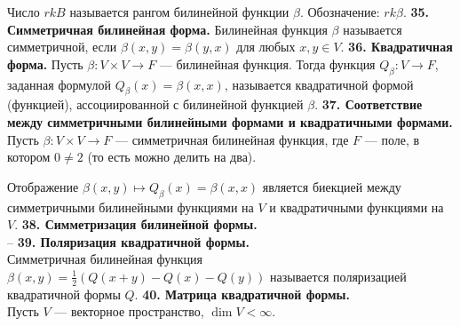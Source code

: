 \documentclass{article}
\begin{document}
Число $rk B$ называется рангом билинейной функции $\beta$. Обозначение: $rk \beta$.
\newline
\newline
\textbf{35. Симметричная билинейная форма.}
Билинейная функция $\beta$ называется симметричной, если $\beta(x, y) =\beta(y, x)$ для любых $x, y \in V$.
\newline
\newline
\textbf{36. Квадратичная форма.}
Пусть $\beta \colon V\times V \rightarrow F$ --- билинейная функция. Тогда функция $Q_\beta \colon V \rightarrow F$, заданная формулой $Q_\beta(x) = \beta(x, x)$, называется квадратичной формой (функцией), ассоциированной с билинейной функцией $\beta$.
\newline
\newline
\textbf{37. Соответствие между симметричными билинейными формами и квадратичными формами.}
Пусть $\beta \colon V\times V \rightarrow F$ --- симметричная билинейная функция, где $F$ --- поле, в котором $0 \neq 2$ (то есть можно делить на два).

Отображение $\beta(x, y) \mapsto Q_\beta(x) = \beta(x, x)$ является биекцией между симметричными билинейными функциями на $V$ и квадратичными функциями на $V$.
\newline
\newline
\textbf{38. Симметризация билинейной формы.}\\
--
\newline
\newline
\textbf{39. Поляризация квадратичной формы.}\\
Симметричная билинейная функция $\beta(x, y) = \frac{1}{2}\left( Q(x + y) - Q(x) - Q(y)  \right)$ называется поляризацией квадратичной формы $Q$.
\newline
\newline
\textbf{40. Матрица квадратичной формы.}\\
Пусть $V$ --- векторное пространство, $\dim V < \infty$.
\end{document}
